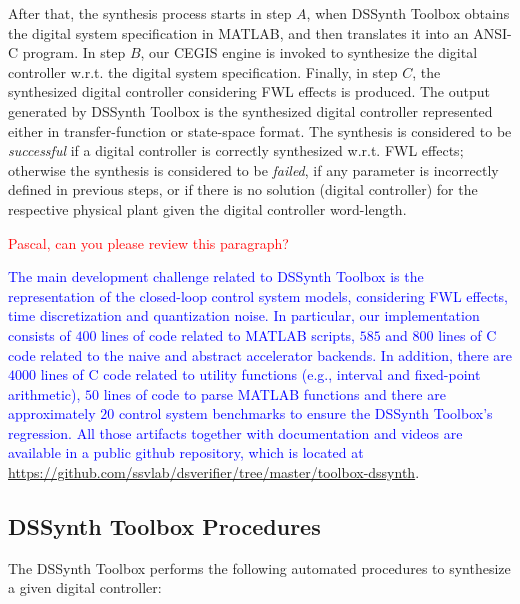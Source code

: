 \documentclass[sigconf]{acmart}
\newcommand\tool{{DSSynth Toolbox}\xspace}
\begin{document}
After that, the synthesis process starts in step $A$, when \tool obtains the digital system 
specification in MATLAB, and then translates it into an ANSI-C program. 
In step $B$, our CEGIS engine is invoked to synthesize the digital controller w.r.t. the digital system
specification. Finally, in step $C$, the synthesized digital controller considering FWL effects is produced. 
The output generated by \tool is the synthesized digital controller represented either in transfer-function 
or state-space format. The synthesis is considered to be \emph{successful} if a digital controller is correctly 
synthesized w.r.t. FWL effects; otherwise the synthesis is considered to be \emph{failed}, if any parameter is 
incorrectly defined in previous steps, or if there is no solution (digital controller) for the respective physical plant
 given the digital controller word-length.

\textcolor{red}{Pascal, can you please review this paragraph?}

\textcolor{blue}{The main development challenge related to \tool is the representation of the
closed-loop control system models, considering FWL effects, time discretization 
and quantization noise.  In particular, our implementation consists of $400$
lines of code related to MATLAB scripts, $585$ and $800$ lines of C code related to the
naive and abstract accelerator backends. In addition, there are $4000$ lines of C code
related to utility functions (e.g., interval and fixed-point arithmetic), $50$ lines
of code to parse MATLAB functions and there are approximately $20$
control system benchmarks to ensure the \tool's regression.  All those artifacts together
with documentation and videos are available in a public github repository,
which is located at \url{https://github.com/ssvlab/dsverifier/tree/master/toolbox-dssynth}}.

\subsection{\tool Procedures}

The \tool performs the following automated procedures 
to synthesize a given digital controller:
\end{document}
